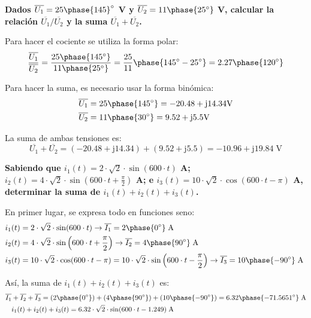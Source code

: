 \vspace{4mm}
\begin{example}
  \textbf{Dados $\overline{U_1}=25\phase{145}^\circ$ V y
    $\overline{U_2}=11\phase{25^\circ}$ V, calcular la relación
    $\overline{U_1}/\overline{U_2}$ y la suma
    $\overline{U_1}+\overline{U_2}$.}
		
  Para hacer el cociente se utiliza la forma polar:
  \begin{equation*}
    \dfrac{\overline{U_1}}{\overline{U_2}}=\dfrac{25\phase{145^\circ}}{11\phase{25^\circ}}=\dfrac{25}{11}\phase{145^\circ-25^\circ}=2.27\phase{120^\circ}
  \end{equation*}
		
  Para hacer la suma, es necesario usar la forma binómica:
  \begin{align*}
    \overline{U_1}&=25\phase{145^\circ}=-20.48+\mathrm{j} 14.34 \si{\volt}\\
    \overline{U_2}&=11\phase{30^\circ}=9.52+\mathrm{j} 5.5 \si{\volt}
  \end{align*}
		
  La suma de ambas tensiones es:
  \begin{equation*}
    \overline{U_1}+\overline{U_2}=(-20.48+\mathrm{j}14.34)+(9.52+\mathrm{j}5.5)=-10.96+\mathrm{j}19.84\;\si{\volt}
  \end{equation*}
\end{example}
	
\vspace{4mm}
\begin{example}
  \textbf{Sabiendo que $i_1(t)=2\cdot\sqrt{2}\cdot \sin(600\cdot t)$
    A;
    $i_2(t)=4\cdot\sqrt{2}\cdot \sin\left(600\cdot
      t+\frac{\pi}{2}\right)$ A; e
    $i_3(t)=10\cdot\sqrt{2}\cdot \cos(600\cdot t-\pi)$ A, determinar
    la suma de $i_1(t)+i_2(t)+i_3(t)$.}
		
  En primer lugar, se expresa todo en funciones seno:
  \begin{align*}
    i_1(t)&=2\cdot\sqrt{2}\cdot \sin(600\cdot t)\rightarrow \overline{I_1}=2\phase{0^\circ}\;\si{\ampere}\\
    i_2(t)&=4\cdot\sqrt{2}\cdot \sin\left(600\cdot t+\frac{\pi}{2}\right)\rightarrow \overline{I_2}=4\phase{90^\circ}\;\si{\ampere}\\
    i_3(t)&=10\cdot\sqrt{2}\cdot \cos(600\cdot t-\pi)=10\cdot\sqrt{2}\cdot \sin\left(600\cdot t-\frac{\pi}{2}\right)\rightarrow \overline{I_3}=10\phase{-90^\circ}\;\si{\ampere}\
  \end{align*}
		
  Así, la suma de $i_1(t)+i_2(t)+i_3(t)$ es:
  \begin{align*}
    \overline{I_1}&+\overline{I_2}+\overline{I_3}=(2\phase{0^\circ})+(4\phase{90^\circ})+(10\phase {-90^\circ})=6.32\phase{-71.5651^\circ}\;\si{\ampere} \\
                  &i_1(t)+i_2(t)+i_3(t)=6.32\cdot\sqrt{2}\cdot \sin(600\cdot t-1.249)\;\si{\ampere}
  \end{align*}
\end{example}
	
